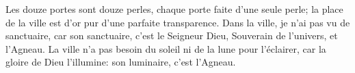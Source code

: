 Les douze portes sont douze perles,
	chaque porte faite d’une seule perle;
	la place de la ville est d’or pur d’une parfaite transparence.
Dans la ville, je n’ai pas vu de sanctuaire,
	car son sanctuaire, c’est le Seigneur Dieu, Souverain de l’univers,
		et l’Agneau.
La ville n’a pas besoin du soleil ni de la lune pour l’éclairer,
	car la gloire de Dieu l’illumine:
	son luminaire, c’est l’Agneau.
